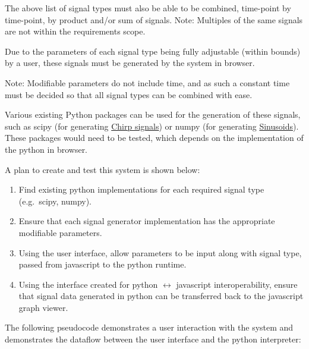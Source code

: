 \documentclass[
  paper=a4,
  ,captions=tableheading
]{scrartcl}
\begin{document}
The above list of signal types must also be able to be combined,
time-point by time-point, by product and/or sum of signals. Note:
Multiples of the same signals are not within the requirements scope.

Due to the parameters of each signal type being fully adjustable (within
bounds) by a user, these signals must be generated by the system in
browser.

Note: Modifiable parameters do not include time, and as such a constant
time must be decided so that all signal types can be combined with ease.

Various existing Python packages can be used for the generation of these
signals, such as scipy (for generating
\href{https://docs.scipy.org/doc/scipy/reference/generated/scipy.signal.chirp.html\#scipy.signal.chirp}{Chirp
signals}) or numpy (for generating
\href{https://numpy.org/doc/stable/reference/generated/numpy.sin.html}{Sinusoids}).
These packages would need to be tested, which depends on the
implementation of the python in browser.

A plan to create and test this system is shown below:
\begin{enumerate}
	\item Find existing python implementations for each required signal type (e.g.~scipy, numpy). 
	\item Ensure that each signal generator implementation has the appropriate modifiable parameters. 
	\item Using the user interface, allow parameters to be input along with signal type, passed from javascript to the python runtime. 
	\item Using the interface created for python $\longleftrightarrow$ javascript interoperability, ensure that signal data generated in python can be transferred back to the javascript graph viewer.
\end{enumerate}

The following pseudocode demonstrates a user interaction with the system
and demonstrates the dataflow between the user interface and the python
interpreter:
\end{document}
